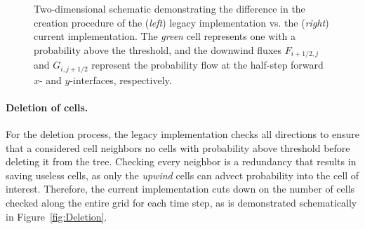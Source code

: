 \documentclass[paper,11pt]{AAS}
\begin{document}
\begin{figure}[htb]
  \caption{Two-dimensional schematic demonstrating the difference in the creation procedure of the ({\it left}) legacy implementation vs. the ({\it right}) current implementation. The {\it green} cell represents one with a probability above the threshold, and the downwind fluxes $F_{i+1/2,j}$ and $G_{i,j+1/2}$ represent the probability flow at the half-step forward $x$- and $y$-interfaces, respectively.}
  \label{fig:Creation}
\end{figure}

\paragraph{Deletion of cells.} 

For the deletion process, the legacy implementation checks all directions to ensure that a considered cell neighbors no cells with probability above threshold before deleting it from the tree. Checking every neighbor is a redundancy that results in saving useless cells, as only the \textit{upwind} cells can advect probability into the cell of interest. Therefore, the current implementation cuts down on the number of cells checked along the entire grid for each time step, as is demonstrated schematically in Figure~\ref{fig:Deletion}. 
\end{document}
